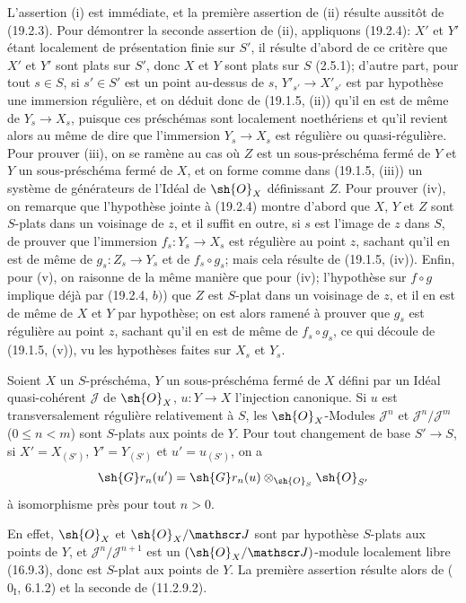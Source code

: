 L'assertion (i) est immédiate, et la première assertion de (ii) résulte aussitôt de (19.2.3). Pour démontrer la seconde assertion de (ii), appliquons (19.2.4): $X'$ et $Y'$ étant localement de présentation finie sur $S'$, il résulte d'abord de ce critère que $X'$ et $Y'$ sont plats sur $S'$, donc $X$ et $Y$ sont plats sur $S$ (2.5.1); d'autre part, pour tout $s\in S$, si $s'\in S'$ est un point au-dessus de $s$, $Y'_{s'}\to X'_{s'}$ est par hypothèse une immersion régulière, et on déduit donc de (19.1.5, (ii)) qu'il en est de même de $Y_s\to X_s$, puisque ces préschémas sont localement noethériens et qu'il revient alors au même de dire que l'immersion $Y_s\to X_s$ est régulière ou quasi-régulière. Pour prouver (iii), on se ramène au cas où $Z$ est un sous-préschéma fermé de $Y$ et $Y$ un sous-préschéma fermé de $X$, et on forme comme dans (19.1.5, (iii)) un système de générateurs de l'Idéal de $\sh{O}_X$ définissant $Z$. Pour prouver (iv), on remarque que l'hypothèse jointe à (19.2.4) montre d'abord que $X$, $Y$ et $Z$ sont $S$-plats dans un voisinage de $z$, et il suffit en outre, si $s$ est l'image de $z$ dans $S$, de prouver que l'immersion $f_s:Y_s\to X_s$ est régulière au point $z$, sachant qu'il en est de même de $g_s:Z_s\to Y_s$ et de $f_s\circ g_s$; mais cela résulte de (19.1.5, (iv)). Enfin, pour (v), on raisonne de la même manière que pour (iv); l'hypothèse sur $f\circ g$ implique déjà par (19.2.4, $b)$) que $Z$ est $S$-plat dans un voisinage de $z$, et il en est de même de $X$ et $Y$ par hypothèse; on est alors ramené à prouver que $g_s$ est régulière au point $z$, sachant qu'il en est de même de $f_s\circ g_s$, ce qui découle de (19.1.5, (v)), vu les hypothèses faites sur $X_s$ et $Y_s$.


\begin{proposition}[19.2.8]
\label{IV.19.2.8}
Soient $X$ un $S$-préschéma, $Y$ un sous-préschéma fermé de $X$ défini par un Idéal quasi-cohérent $\mathscr J$ de $\sh{O}_X$, $u:Y\to X$ l'injection canonique. Si $u$ est transversalement régulière relativement à $S$, les $\sh{O}_X$-Modules $\mathscr J^n$ et $\mathscr J^n/\mathscr J^m$ ($0\leq n<m$) sont $S$-plats aux points de $Y$. Pour tout changement de base $S'\to S$, si $X'=X_{(S')}$, $Y'=Y_{(S')}$ et $u'=u_{(S')}$, on a
\[
  \sh{G}r_n(u')=\sh{G}r_n(u)\otimes_{\sh{O}_S}\sh{O}_{S'}
\]
à isomorphisme près pour tout $n>0$.
\end{proposition}

En effet, $\sh{O}_X$ et $\sh{O}_X/\mathscr J$ sont par hypothèse $S$-plats aux points de $Y$, et $\mathscr J^n/\mathscr J^{n+1}$ est un $(\sh{O}_X/\mathscr J)$-module localement libre (16.9.3), donc est $S$-plat aux points de $Y$. La première assertion résulte alors de ($0_{\mathrm I}$, 6.1.2) et la seconde de (11.2.9.2).

